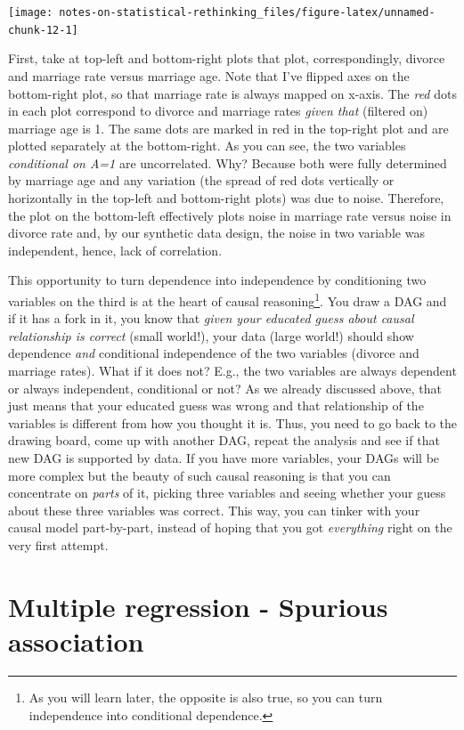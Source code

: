 \documentclass[
]{book}
\begin{document}
\begin{center}\texttt{[image: notes-on-statistical-rethinking\_files/figure-latex/unnamed-chunk-12-1]} \end{center}

First, take at top-left and bottom-right plots that plot, correspondingly, divorce and marriage rate versus marriage age. Note that I've flipped axes on the bottom-right plot, so that marriage rate is always mapped on x-axis. The \emph{red} dots in each plot correspond to divorce and marriage rates \emph{given that} (filtered on) marriage age is 1. The same dots are marked in red in the top-right plot and are plotted separately at the bottom-right. As you can see, the two variables \emph{conditional on A=1} are uncorrelated. Why? Because both were fully determined by marriage age and any variation (the spread of red dots vertically or horizontally in the top-left and bottom-right plots) was due to noise. Therefore, the plot on the bottom-left effectively plots noise in marriage rate versus noise in divorce rate and, by our synthetic data design, the noise in two variable was independent, hence, lack of correlation.

This opportunity to turn dependence into independence by conditioning two variables on the third is at the heart of causal reasoning\footnote{As you will learn later, the opposite is also true, so you can turn independence into conditional dependence.}. You draw a DAG and if it has a fork in it, you know that \emph{given your educated guess about causal relationship is correct} (small world!), your data (large world!) should show dependence \emph{and} conditional independence of the two variables (divorce and marriage rates). What if it does not? E.g., the two variables are always dependent or always independent, conditional or not? As we already discussed above, that just means that your educated guess was wrong and that relationship of the variables is different from how you thought it is. Thus, you need to go back to the drawing board, come up with another DAG, repeat the analysis and see if that new DAG is supported by data. If you have more variables, your DAGs will be more complex but the beauty of such causal reasoning is that you can concentrate on \emph{parts} of it, picking three variables and seeing whether your guess about these three variables was correct. This way, you can tinker with your causal model part-by-part, instead of hoping that you got \emph{everything} right on the very first attempt.

\hypertarget{spurious-association}{%
\chapter{Multiple regression - Spurious association}\label{spurious-association}}
\end{document}
